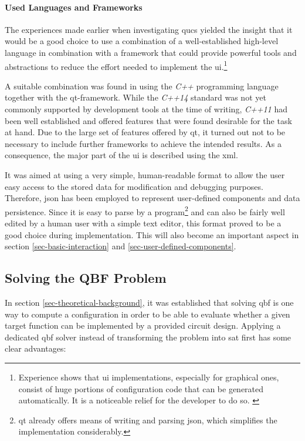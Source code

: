 	\paragraph{Used Languages and Frameworks}		
		The experiences made earlier 
		when investigating \gls{qucs} yielded the insight that it would be a good choice to use a combination of a well-established high-level language in combination with a framework that could provide powerful tools and abstractions to reduce the effort needed to implement the \gls{ui}.\footnote{
			Experience shows that \gls{ui} implementations, especially for graphical ones,  consist of huge portions of configuration code that can be generated automatically. 
			It is a noticeable relief for the developer to do so.
			\cite{UIgen} \cite{UIgen2}
		}
		
		A suitable combination was found in using the \emph{C++} programming language together with the \gls{qt}-framework.
		While the \emph{C++14} standard was not yet commonly supported by development tools at the time of writing, \emph{C++11} had been well established and offered features that were found desirable for the task at hand.
		Due to the large set of features offered by \gls{qt}, it turned out not to be necessary to include further frameworks to achieve the intended results.
		As a consequence, the major part of the \gls{ui} is described using the \gls{xml}.

		It was aimed at using a very simple, human-readable format to allow the user easy access to the stored data for modification and debugging purposes.
		Therefore, \Gls{json} has been employed to represent user-defined components and data persistence.
		Since it is easy to parse by a program\footnote{
			\gls{qt} already offers means of writing and parsing \gls{json}, which simplifies the implementation considerably.
		} and can also be fairly well edited by a human user with a simple text editor, this format proved to be a good choice during implementation.
		This will also become an important aspect in section \ref{sec-basic-interaction} and \ref{sec-user-defined-components}.

\subsection{Solving the QBF Problem}
	\label{sec-solving-qbf}
		
	In section \ref{sec-theoretical-background}, it was established that solving \gls{qbf} is one way to compute a configuration in order to be able to evaluate whether a given target function can be implemented by a provided circuit design.
	Applying a dedicated \gls{qbf} solver instead of transforming the problem into \gls{sat} first has some clear advantages:

